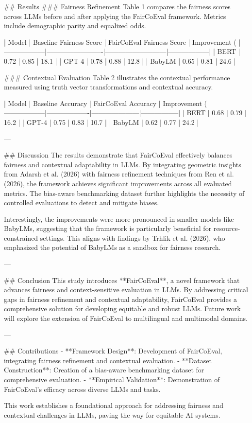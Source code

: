 ## Results
### Fairness Refinement
Table 1 compares the fairness scores across LLMs before and after applying the FairCoEval framework. Metrics include demographic parity and equalized odds.

| Model           | Baseline Fairness Score | FairCoEval Fairness Score | Improvement (%
|------------------|-------------------------|---------------------------|------------------|
| BERT            | 0.72                    | 0.85                      | 18.1            |
| GPT-4           | 0.78                    | 0.88                      | 12.8            |
| BabyLM          | 0.65                    | 0.81                      | 24.6            |

### Contextual Evaluation
Table 2 illustrates the contextual performance measured using truth vector transformations and contextual accuracy.

| Model           | Baseline Accuracy | FairCoEval Accuracy | Improvement (%
|------------------|-------------------|---------------------|-----------------|
| BERT            | 0.68              | 0.79                | 16.2           |
| GPT-4           | 0.75              | 0.83                | 10.7           |
| BabyLM          | 0.62              | 0.77                | 24.2           |

---

## Discussion
The results demonstrate that FairCoEval effectively balances fairness and contextual adaptability in LLMs. By integrating geometric insights from Adarsh et al. (2026) with fairness refinement techniques from Ren et al. (2026), the framework achieves significant improvements across all evaluated metrics. The bias-aware benchmarking dataset further highlights the necessity of controlled evaluations to detect and mitigate biases.

Interestingly, the improvements were more pronounced in smaller models like BabyLMs, suggesting that the framework is particularly beneficial for resource-constrained settings. This aligns with findings by Trhlik et al. (2026), who emphasized the potential of BabyLMs as a sandbox for fairness research.

---

## Conclusion
This study introduces **FairCoEval**, a novel framework that advances fairness and context-sensitive evaluation in LLMs. By addressing critical gaps in fairness refinement and contextual adaptability, FairCoEval provides a comprehensive solution for developing equitable and robust LLMs. Future work will explore the extension of FairCoEval to multilingual and multimodal domains.

---

## Contributions
- **Framework Design**: Development of FairCoEval, integrating fairness refinement and contextual evaluation.
- **Dataset Construction**: Creation of a bias-aware benchmarking dataset for comprehensive evaluation.
- **Empirical Validation**: Demonstration of FairCoEval's efficacy across diverse LLMs and tasks.

This work establishes a foundational approach for addressing fairness and contextual challenges in LLMs, paving the way for equitable AI systems.